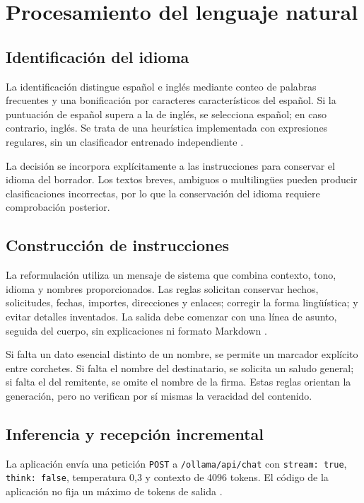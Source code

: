 \documentclass[conference]{IEEEtran}
\begin{document}
\section{Procesamiento del lenguaje natural}
\subsection{Identificación del idioma}
La identificación distingue español e inglés mediante conteo de palabras frecuentes y una bonificación por caracteres característicos del español. Si la puntuación de español supera a la de inglés, se selecciona español; en caso contrario, inglés. Se trata de una heurística implementada con expresiones regulares, sin un clasificador entrenado independiente \cite{ollama}.

La decisión se incorpora explícitamente a las instrucciones para conservar el idioma del borrador. Los textos breves, ambiguos o multilingües pueden producir clasificaciones incorrectas, por lo que la conservación del idioma requiere comprobación posterior.

\subsection{Construcción de instrucciones}
La reformulación utiliza un mensaje de sistema que combina contexto, tono, idioma y nombres proporcionados. Las reglas solicitan conservar hechos, solicitudes, fechas, importes, direcciones y enlaces; corregir la forma lingüística; y evitar detalles inventados. La salida debe comenzar con una línea de asunto, seguida del cuerpo, sin explicaciones ni formato Markdown \cite{ollama}.

Si falta un dato esencial distinto de un nombre, se permite un marcador explícito entre corchetes. Si falta el nombre del destinatario, se solicita un saludo general; si falta el del remitente, se omite el nombre de la firma. Estas reglas orientan la generación, pero no verifican por sí mismas la veracidad del contenido.

\subsection{Inferencia y recepción incremental}
La aplicación envía una petición \texttt{POST} a \texttt{/ollama/api/chat} con \texttt{stream: true}, \texttt{think: false}, temperatura 0,3 y contexto de 4096 tokens. El código de la aplicación no fija un máximo de tokens de salida \cite{ollama}.
\end{document}

